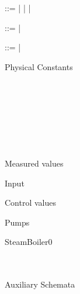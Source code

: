 \documentclass{article}
\begin{document}
\begin{zed}
 ::=  |  |  | 
\end{zed}

\begin{zed}
 ::=  |
\end{zed}

\begin{zed}
 ::=  | 
\end{zed}

Physical Constants

\begin{axdef}
 \\
 \\
 \\
 \\
 \\
 \\
\where
{}
\end{axdef}

Measured values

\begin{schema}{Input}
 \\
\end{schema}

Control values

\begin{schema}{Pumps}
\end{schema}

\begin{schema}{SteamBoiler0}
 \\
 \\
 \\
\end{schema}

Auxiliary Schemata
\end{document}
